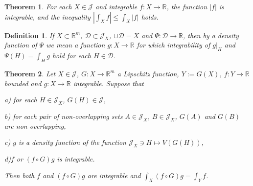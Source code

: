 \documentclass{article}
\newtheorem{theorem}{Theorem}
\newtheorem{definition}{Definition}
\newcommand{\R}{\ensuremath{\mathbb R}}
\newcommand{\J}{\mathscr{J}}
\newcommand{\D}{\mathscr{D}}
\begin{document}
\begin{theorem}\label{absz}
For each $X\in\J$ and integrable $f\colon X\to\R$, the function
$|f|$ is integrable, and the inequality
$\left|\int_Xf\right|\le\int_X|f|$ holds.
\end{theorem}

\begin{definition}
If $X\subset\R^m$, $\D\subset\J_X$, $\cup\D=X$ and
$\Psi\colon\D\to\R$, then by a density function of $\Psi$ we mean a
function $g\colon X\to\R$ for which integrability of $g|_H$ and
$\Psi(H)=\int_Hg$ hold for each $H\in\D$.
\end{definition}

\begin{theorem}\label{alap}
Let $X\in\J$, $G\colon X\to\R^m$ a Lipschitz function, $Y:=G(X)$,
$f\colon Y\to\R$ bounded and $g\colon X\to\R$ integrable. Suppose
that

\noindent a) for each $H\in\J_X$, $G(H)\in\J$,

\noindent b) for each pair of non-overlapping sets $A\in\J_X$,
$B\in\J_X$, $G(A)$ and $G(B)$ are non-overlapping,

\noindent c) $g$ is a density function of the function $\J_X\ni
H\mapsto V(G(H))$,

\noindent d)$f$ or $(f\circ G)g$ is integrable.

Then both $f$ and $(f\circ G)g$ are integrable and $\int_X(f\circ
G)g=\int_Yf$.
\end{theorem}
\end{document}
